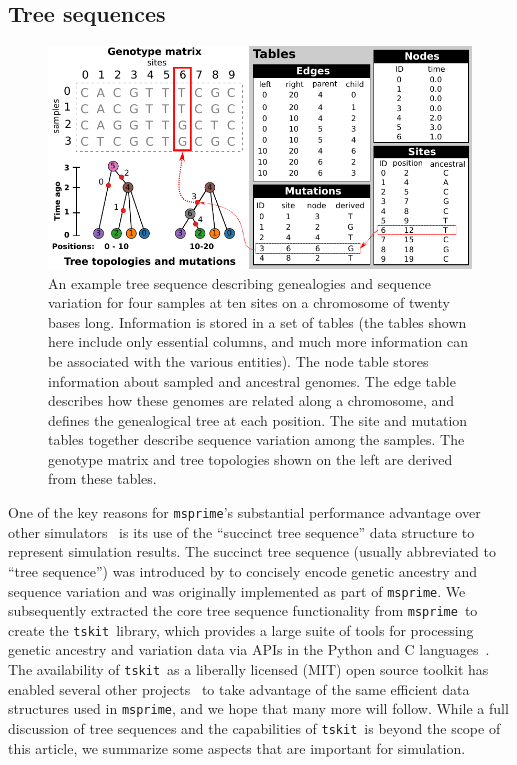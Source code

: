 \documentclass[9pt,twocolumn,twoside,lineno]{gsajnl}
\newcommand{\msprime}[0]{\texttt{msprime}}
\newcommand{\tskit}[0]{\texttt{tskit}}
\begin{document}
\subsection*{Tree sequences}
\label{sec-ts}

\begin{figure}
\begin{center}
\includegraphics{illustrations/example_tree_sequence}
\end{center}
\caption{\label{fig-ts-example} An example tree sequence describing
genealogies and sequence variation for four samples at ten sites
on a chromosome of twenty bases long.
Information is stored in a set of tables
(the tables shown here include only essential columns, and
much more information can be associated with the various entities).
The node table
stores information about sampled and ancestral genomes. The
edge table describes how these genomes are related along a
chromosome, and defines the genealogical tree at each position.
The site and mutation tables together describe sequence variation
among the samples. The genotype matrix and tree topologies shown
on the left are derived from these tables.
}
\end{figure}

One of the key reasons for \msprime's substantial performance advantage
over other simulators~\citep{kelleher2016efficient}
is its use of the ``succinct tree sequence''
data structure to represent simulation results.
The succinct tree sequence (usually abbreviated to ``tree sequence'')
was introduced by \cite{kelleher2016efficient}
to concisely encode genetic ancestry and sequence variation
and was originally implemented as part of \msprime.
We subsequently extracted the core tree sequence functionality
from \msprime\ to create the \tskit\ library,
which provides a large suite of tools for processing genetic ancestry
and variation data via APIs
in the Python and C languages~\citep{tskit2021tskit}.
The availability of \tskit\ as a liberally licensed (MIT) open source
toolkit has enabled several other
projects~\citep[e.g.][]{kelleher2019inferring,haller2019slim,wohns2021unified,
de2021geonomics} to take advantage
of the same efficient data structures used in \msprime,
and we hope that many more will follow.
While a full discussion of tree sequences and the capabilities
of \tskit\ is beyond the scope of this article, we summarize
some aspects that are important for simulation.
\end{document}
